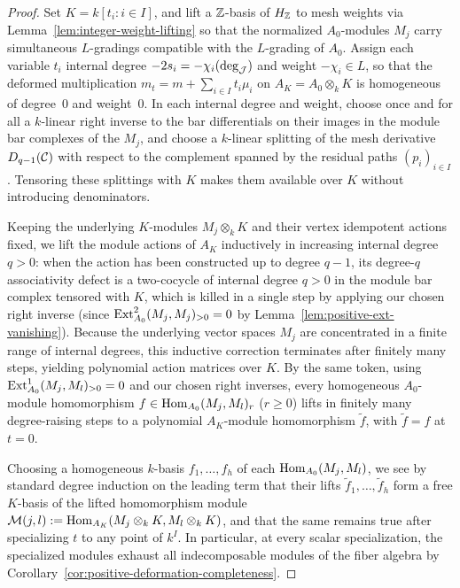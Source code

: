 \begin{proof}
Set $K=k[t_i:i\in I]$, and lift a $\mathbb Z$-basis of $H_\mathbb Z$ to mesh weights via Lemma~\ref{lem:integer-weight-lifting} so that the normalized $A_0$-modules $M_j$ carry simultaneous $L$-gradings compatible with the $L$-grading of $A_0$. Assign each variable $t_i$ internal degree $-2s_i=-\chi_i(\deg_\mathcal J)$ and weight $-\chi_i\in L$, so that the deformed multiplication $m_t=m+\sum_{i\in I}t_i\mu_i$ on $A_K=A_0\otimes_k K$ is homogeneous of degree~$0$ and weight~$0$. In each internal degree and weight, choose once and for all a $k$-linear right inverse to the bar differentials on their images in the module bar complexes of the $M_j$, and choose a $k$-linear splitting of the mesh derivative $D_{q-1}(\mathcal C)$ with respect to the complement spanned by the residual paths $(p_i)_{i\in I}$. Tensoring these splittings with $K$ makes them available over $K$ without introducing denominators.

Keeping the underlying $K$-modules $M_j\otimes_k K$ and their vertex idempotent actions fixed, we lift the module actions of $A_K$ inductively in increasing internal degree $q>0$: when the action has been constructed up to degree $q-1$, its degree-$q$ associativity defect is a two-cocycle of internal degree $q>0$ in the module bar complex tensored with $K$, which is killed in a single step by applying our chosen right inverse (since $\operatorname{Ext}^2_{A_0}(M_j,M_j)_{>0}=0$ by Lemma~\ref{lem:positive-ext-vanishing}). Because the underlying vector spaces $M_j$ are concentrated in a finite range of internal degrees, this inductive correction terminates after finitely many steps, yielding polynomial action matrices over $K$. By the same token, using $\operatorname{Ext}^1_{A_0}(M_j,M_l)_{>0}=0$ and our chosen right inverses, every homogeneous $A_0$-module homomorphism $f\in\operatorname{Hom}_{A_0}(M_j,M_l)_r$ ($r\geq0$) lifts in finitely many degree-raising steps to a polynomial $A_K$-module homomorphism $\widetilde f$, with $\widetilde f=f$ at $t=0$.

Choosing a homogeneous $k$-basis $f_1,\ldots,f_h$ of each $\operatorname{Hom}_{A_0}(M_j,M_l)$, we see by standard degree induction on the leading term that their lifts $\widetilde f_1,\ldots,\widetilde f_h$ form a free $K$-basis of the lifted homomorphism module $\mathcal M(j,l):=\operatorname{Hom}_{A_K}(M_j\otimes_k K,M_l\otimes_k K)$, and that the same remains true after specializing $t$ to any point of $k^I$. In particular, at every scalar specialization, the specialized modules exhaust all indecomposable modules of the fiber algebra by Corollary~\ref{cor:positive-deformation-completeness}.


\end{proof}
